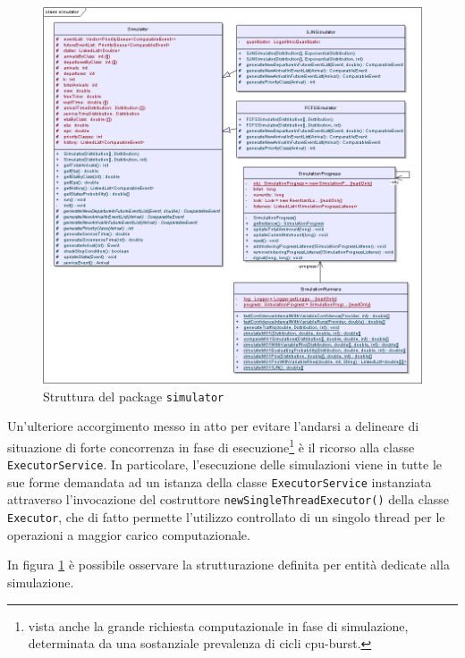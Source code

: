 \begin{figure}[!h]{
	\begin{center}
	   \includegraphics[width=\textwidth]{figures/simulatorclass.png}
	\end{center}}
	\caption{Struttura del package {\tt simulator}}
	\label{fig:simulatorclass}
\end{figure}

Un'ulteriore accorgimento messo in atto per evitare l'andarsi a delineare di situazione di forte concorrenza in fase di esecuzione\footnote{vista anche la grande richiesta computazionale in fase di simulazione, determinata da una sostanziale prevalenza di cicli cpu-burst.} \`e il ricorso alla classe {\tt ExecutorService}. In particolare, l'esecuzione delle simulazioni viene in tutte le sue forme demandata ad un istanza della classe {\tt ExecutorService} instanziata attraverso l'invocazione del costruttore {\tt newSingleThreadExecutor()} della classe {\tt Executor}, che di fatto permette l'utilizzo controllato di un singolo thread per le operazioni a maggior carico computazionale.

In figura \ref{fig:simulatorclass} \`e possibile osservare la strutturazione definita per entit\`a dedicate alla simulazione.

